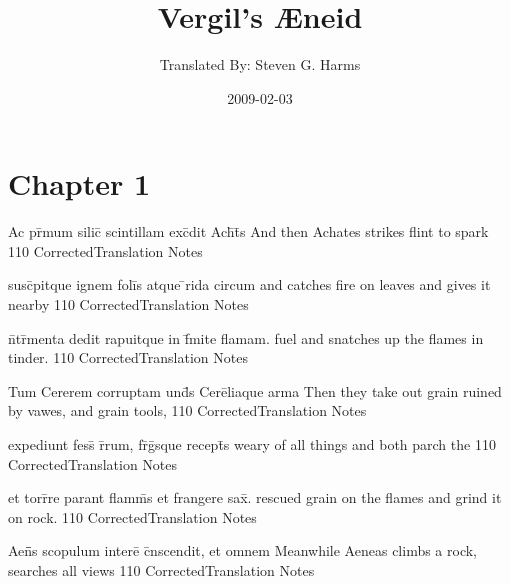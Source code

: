 \documentclass[]{book}
\title{Vergil's {\AE}neid}
\author{ Translated By:  Steven G. Harms }
\date{2009-02-03}
\begin{document}

\ifpdf
{}
\else
{}
\fi

\enumstyle 

\maketitle
\tableofcontents

\chapter{Chapter 1}
%
%
%
%
%
%


\latline
  {Ac pr\={\macron {\i}}mum silic\={\macron {\i}} scintillam exc\={}dit Ach\={}t\={}s}
  { And then Achates strikes flint to spark }
  {110}
  { CorrectedTranslation }
  { Notes }



\latline
  {susc\={}pitque ignem foli\={\macron {\i}}s atque \={}rida circum}
  { and catches fire on leaves and gives it nearby }
  {110}
  { CorrectedTranslation }
  { Notes }


\latline
  {n\={}tr\={\macron {\i}}menta dedit rapuitque in f\={}mite flamam.}
  { fuel and snatches up the flames in tinder. }
  {110}
  { CorrectedTranslation }
  { Notes }


\latline
  {Tum Cererem corruptam und\={\macron {\i}}s Cere\={}liaque arma}
  { Then they take out grain ruined by vawes, and grain tools, }
  {110}
  { CorrectedTranslation }
  { Notes }



\latline
  {expediunt fess\={\macron {\i}} r\={}rum, fr\={}g\={}sque recept\={}s}
  { weary of all things and both parch the  }
  {110}
  { CorrectedTranslation }
  { Notes }


\latline
  {et torr\={}re parant flamm\={\macron {\i}}s et frangere sax\={}.}
  { rescued grain on the flames and grind it on rock. }
  {110}
  { CorrectedTranslation }
  { Notes }


\latline
  {Aen\={}\={}s scopulum intere\={} c\={}nscendit, et omnem}
  { Meanwhile Aeneas climbs a rock, searches all views }
  {110}
  { CorrectedTranslation }
  { Notes }
\end{document}
